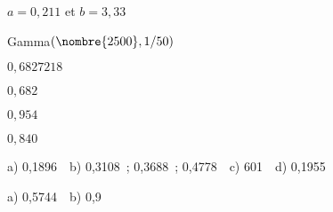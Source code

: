 \begin{reponse}{2.15}
    $a = 0,211$ et $b = 3,33$
  
\end{reponse}
\begin{reponse}{2.18}

    \begin{inparaenum}
    \item Gamma$(\nombre{2500}, 1/50)$
    \item $0,6827218$
    \item $0,682$
    \end{inparaenum}
  
\end{reponse}
\begin{reponse}{2.19}
    $0,954$
  
\end{reponse}
\begin{reponse}{2.20}
    $0,840$
  
\end{reponse}
\begin{reponse}{2.22}
a) 0,1896 \,\, b) 0,3108~; 0,3688~; 0,4778 \,\, c) 601 \,\, d) 0,1955
\end{reponse}
\begin{reponse}{2.23}
a) 0,5744 \,\, b) 0,9
\end{reponse}
